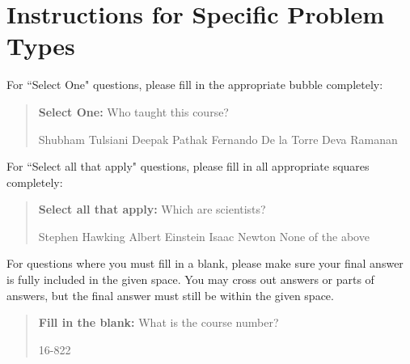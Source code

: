 \documentclass[11pt,addpoints,answers]{exam}
\numberwithin{equation}{section} %
\numberwithin{figure}{section} %
\numberwithin{table}{section} %
\begin{document}
\section*{Instructions for Specific Problem Types}

For ``Select One" questions, please fill in the appropriate bubble completely:

\begin{quote}
\textbf{Select One:} Who taught this course?
     \begin{checkboxes}
     \CorrectChoice Shubham Tulsiani
     \choice Deepak Pathak
     \choice Fernando De la Torre
     \choice Deva Ramanan
    \end{checkboxes}
\end{quote}

For ``Select all that apply" questions, please fill in all appropriate squares completely:

\begin{quote}
\textbf{Select all that apply:} Which are scientists?
{
    \checkboxchar{$\Box$} \checkedchar{$\blacksquare$}
    \begin{checkboxes}
     \CorrectChoice Stephen Hawking
     \CorrectChoice Albert Einstein
     \CorrectChoice Isaac Newton
     \choice None of the above
    \end{checkboxes}
    }
\end{quote}

For questions where you must fill in a blank, please make sure your final answer is fully included in the given space. You may cross out answers or parts of answers, but the final answer must still be within the given space.

\begin{quote}
\textbf{Fill in the blank:} What is the course number?

\begin{tcolorbox}[fit,height=1cm, width=4cm, blank, borderline={1pt}{-2pt},nobeforeafter, halign=center, valign=center]
    \begin{center}\huge16-822\end{center}
    \end{tcolorbox}\hspace{2cm}
\end{quote}

\clearpage
\end{document}
